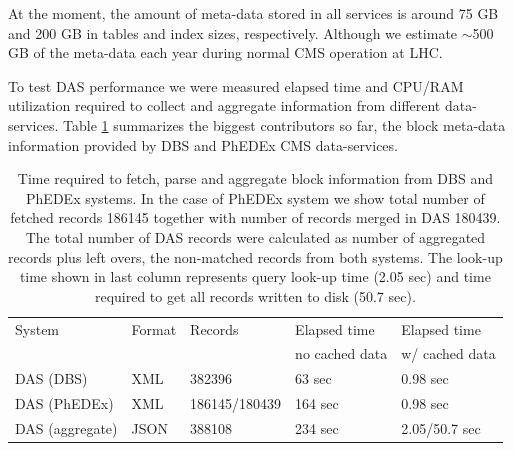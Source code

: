 \documentclass[1p,times]{elsarticle}
\begin{document}
At the moment, the amount of meta-data stored in all services is around
75 GB and 200 GB in tables and index sizes, respectively. Although we estimate 
$\sim$500 GB of the meta-data each year during 
normal CMS operation at LHC.

To test DAS performance we were measured elapsed time and CPU/RAM utilization
required to collect and aggregate information from different
data-services. Table \ref{DAS_benchmark} summarizes the biggest 
contributors so far, the block meta-data information provided by DBS and 
PhEDEx CMS data-services. 

\begin{table}[hbt]
\centering
\begin{tabular}{lllll}\hline
\hline
System & Format & Records & Elapsed time & Elapsed time \\
& & & no cached data & w/ cached data \\
\hline
DAS (DBS) & XML & 382396 & 63 sec & 0.98 sec \\
DAS (PhEDEx) & XML & 186145/180439 & 164 sec & 0.98 sec \\
DAS (aggregate) & JSON & 388108 & 234 sec & 2.05/50.7 sec \\
\hline
\hline
\end{tabular}
\caption{Time required to fetch, parse and aggregate block information
from DBS and PhEDEx systems. In the case of PhEDEx
system we show total number of fetched records 186145 together with
number of records merged in DAS 180439. The total number of DAS records 
were calculated as number of aggregated records plus left overs,
the non-matched records from both systems. The look-up time shown in
last column represents query look-up time (2.05 sec) and time required
to get all records written to disk (50.7 sec).}
\label{DAS_benchmark}
\end{table}
\end{document}
